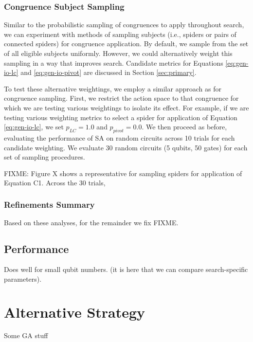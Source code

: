 \subsubsection*{Congruence Subject Sampling}

Similar to the probabilistic sampling of congruences to apply throughout search, we can experiment with methods of sampling subjects (i.e., spiders or pairs of connected spiders) for congruence application.
By default, we sample from the set of all eligible subjects uniformly.
However, we could alternatively weight this sampling in a way that improves search.
Candidate metrics for Equations \ref{eq:gen-io-lc} and \ref{eq:gen-io-pivot} are discussed in Section \ref{sec:primary}.

To test these alternative weightings, we employ a similar approach as for congruence sampling.
First, we restrict the action space to that congruence for which we are testing various weightings to isolate its effect.
For example, if we are testing various weighting metrics to select a spider for application of Equation \ref{eq:gen-io-lc}, we set $p_{LC} = 1.0$ and $p_{pivot} = 0.0$.
We then proceed as before, evaluating the performance of SA on random circuits across 10 trials for each candidate weighting.
We evaluate 30 random circuits (5 qubits, 50 gates) for each set of sampling procedures.

FIXME: Figure X shows a representative for sampling spiders for application of Equation C1. Across the 30 trials,



\subsubsection*{Refinements Summary}

Based on these analyses, for the remainder we fix FIXME.

\subsection{Performance}

Does well for small qubit numbers. (it is here that we can compare search-specific parameters).

\section{Alternative Strategy}

Some GA stuff
